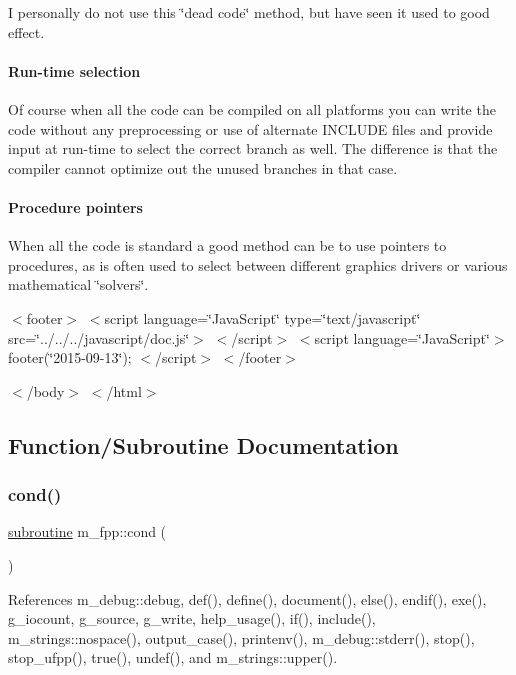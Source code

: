 I personally do not use this \char`\"{}dead code\char`\"{} method, but have seen it used to good effect. 

\paragraph*{Run-\/time selection}

Of course when all the code can be compiled on all platforms you can write the code without any preprocessing or use of alternate I\+N\+C\+L\+U\+DE files and provide input at run-\/time to select the correct branch as well. The difference is that the compiler cannot optimize out the unused branches in that case. 

\paragraph*{Procedure pointers}

When all the code is standard a good method can be to use pointers to procedures, as is often used to select between different graphics drivers or various mathematical \char`\"{}solvers\char`\"{}. 

$<$footer$>$ $<$script language=\char`\"{}\+Java\+Script\char`\"{} type=\char`\"{}text/javascript\char`\"{} src=\char`\"{}../../../javascript/doc.\+js\char`\"{}$>$ $<$/script$>$ $<$script language=\char`\"{}\+Java\+Script\char`\"{}$>$ footer(\char`\"{}2015-\/09-\/13\char`\"{}); $<$/script$>$ $<$/footer$>$

$<$/body$>$ $<$/html$>$ 

\subsection{Function/\+Subroutine Documentation}
\mbox{\label{namespacem__fpp_a3aa7c291b265d02ad91b3bb29e797156}} 
\subsubsection{\texorpdfstring{cond()}{cond()}}
{\footnotesize\ttfamily \hyperlink{M__stopwatch_83_8txt_acfbcff50169d691ff02d4a123ed70482}{subroutine} m\+\_\+fpp\+::cond (\begin{DoxyParamCaption}{ }\end{DoxyParamCaption})}



References m\+\_\+debug\+::debug, def(), define(), document(), else(), endif(), exe(), g\+\_\+iocount, g\+\_\+source, g\+\_\+write, help\+\_\+usage(), if(), include(), m\+\_\+strings\+::nospace(), output\+\_\+case(), printenv(), m\+\_\+debug\+::stderr(), stop(), stop\+\_\+ufpp(), true(), undef(), and m\+\_\+strings\+::upper().

